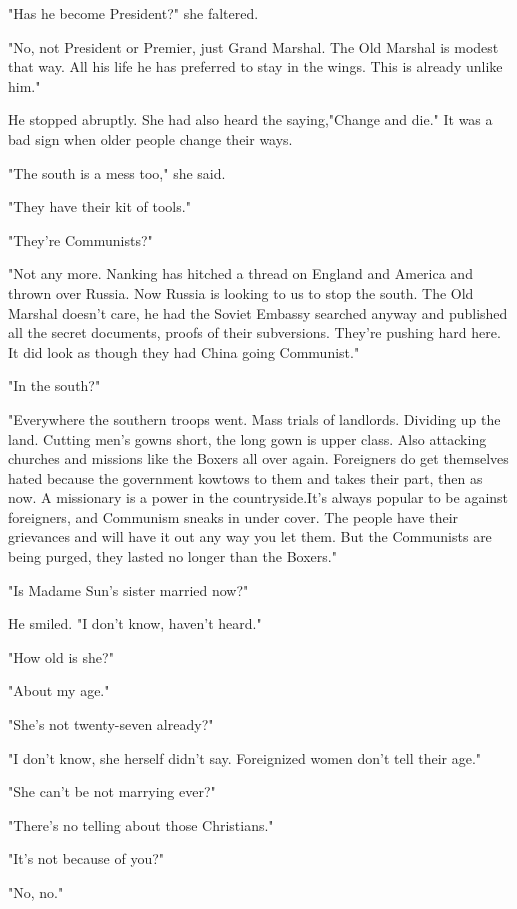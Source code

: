 \par "Has he become President?" she faltered.
\par "No, not President or Premier, just Grand Marshal. The Old Marshal is modest that way. All his life he has preferred to stay in the wings. This is already unlike him."
\par He stopped abruptly. She had also heard the saying,"Change and die." It was a bad sign when older people change their ways.
\par "The south is a mess too," she said.
\par "They have their kit of tools."
\par "They're Communists?"
\par "Not any more. Nanking has hitched a thread on England and America and thrown over Russia. Now Russia is looking to us to stop the south. The Old Marshal doesn't care, he had the Soviet Embassy searched anyway and published all the secret documents, proofs of their subversions. They're pushing hard here. It did look as though they had China going Communist."
\par "In the south?"
\par "Everywhere the southern troops went. Mass trials of landlords. Dividing up the land. Cutting men's gowns short, the long gown is upper class. Also attacking churches and missions like the Boxers all over again. Foreigners do get themselves hated because the government kowtows to them and takes their part, then as now. A missionary is a power in the countryside.It's always popular to be against foreigners, and Communism sneaks in under cover. The people have their grievances and will have it out any way you let them. But the Communists are being purged, they lasted no longer than the Boxers."
\par "Is Madame Sun's sister married now?"
\par He smiled. "I don't know, haven't heard."
\par "How old is she?"
\par "About my age."
\par "She's not twenty-seven already?"
\par "I don't know, she herself didn't say. Foreignized women don't tell their age."
\par "She can't be not marrying ever?"
\par "There's no telling about those Christians."
\par "It's not because of you?"
\par "No, no."
